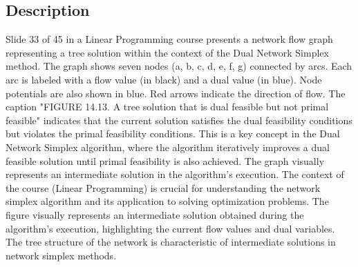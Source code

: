 \documentclass{article}%
\begin{document}
\underline{}
%
\subsection{Description}%
Slide 33 of 45 in a Linear Programming course presents a network flow graph representing a tree solution within the context of the Dual Network Simplex method. The graph shows seven nodes (a, b, c, d, e, f, g) connected by arcs. Each arc is labeled with a flow value (in black) and a dual value (in blue).  Node potentials are also shown in blue. Red arrows indicate the direction of flow. The caption "FIGURE 14.13. A tree solution that is dual feasible but not primal feasible" indicates that the current solution satisfies the dual feasibility conditions but violates the primal feasibility conditions. This is a key concept in the Dual Network Simplex algorithm, where the algorithm iteratively improves a dual feasible solution until primal feasibility is also achieved. The graph visually represents an intermediate solution in the algorithm's execution. The context of the course (Linear Programming) is crucial for understanding the network simplex algorithm and its application to solving optimization problems. The figure visually represents an intermediate solution obtained during the algorithm's execution, highlighting the current flow values and dual variables. The tree structure of the network is characteristic of intermediate solutions in network simplex methods.%
\end{document}
